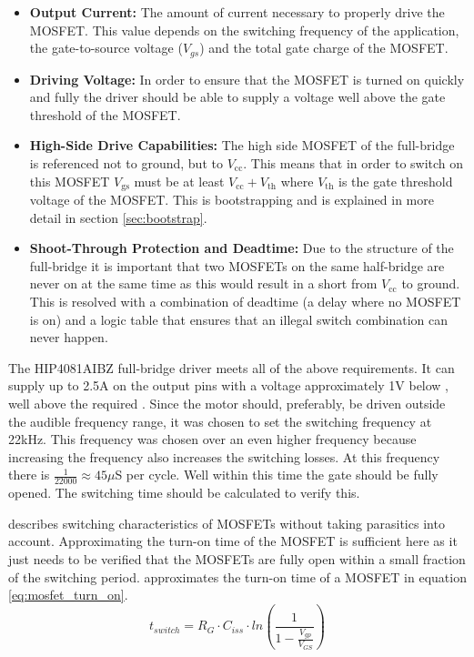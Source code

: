\begin{itemize}
	\item \textbf{Output Current:} The amount of current necessary to properly drive the MOSFET.
	This value depends on the switching frequency of the application, the gate-to-source voltage ($V_{gs}$) and the total gate charge of the MOSFET.
	\item \textbf{Driving Voltage:} In order to ensure that the MOSFET is turned on quickly and fully the driver should be able to supply a voltage well above the gate threshold of the MOSFET.
	\item \textbf{High-Side Drive Capabilities:} The high side MOSFET of the full-bridge is referenced not to ground, but to $V_{\text{cc}}$.
	This means that in order to switch on this MOSFET $V_{\text{gs}}$ must be at least $V_{\text{cc}}+V_{\text{th}}$ where $V_{\text{th}}$ is the gate threshold voltage of the MOSFET.
	This is bootstrapping and is explained in more detail in section \ref{sec:bootstrap}.
	\item \textbf{Shoot-Through Protection and Deadtime:} Due to the structure of the full-bridge it is important that two MOSFETs on the same half-bridge are never on at the same time as this would result in a short from $V_{\text{cc}}$ to ground.
	This is resolved with a combination of deadtime (a delay where no MOSFET is on) and a logic table that ensures that an illegal switch combination can never happen.
\end{itemize}

The HIP4081AIBZ \cite{driver} full-bridge driver meets all of the above requirements.
It can supply up to 2.5A on the output pins with a voltage approximately 1V below \vcc, well above the required \vth.
Since the motor should, preferably, be driven outside the audible frequency range, it was chosen to set the switching frequency at 22kHz.
This frequency was chosen over an even higher frequency because increasing the frequency also increases the switching losses.
At this frequency there is $\frac{1}{22000}\approx45\mu$S per cycle. 
Well within this time the gate should be fully opened.
The switching time should be calculated to verify this.

\cite{mosfet_switch_app_note} describes switching characteristics of MOSFETs without taking parasitics into account.
Approximating the turn-on time of the MOSFET is sufficient here as it just needs to be verified that the MOSFETs are fully open within a small fraction of the switching period.
\cite{mosfet_switch_app_note} approximates the turn-on time of a MOSFET in equation \ref{eq:mosfet_turn_on}.
\begin{equation}
t_{switch} = R_G \cdot C_{iss} \cdot ln\left(\frac{1}{1-\frac{V_{gp}}{V_{GS}}}\right) 
\label{eq:mosfet_turn_on}
\end{equation}

